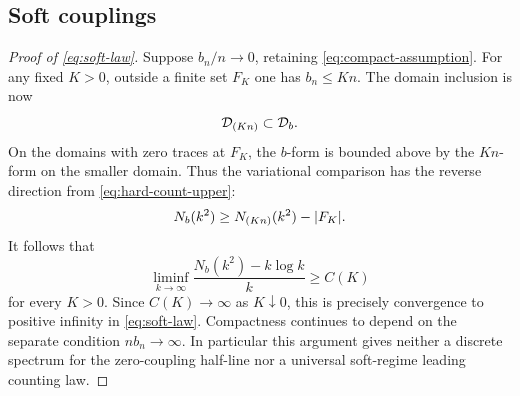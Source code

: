 \subsection{Soft couplings}

\begin{proof}[Proof of \eqref{eq:soft-law}]
Suppose $b_n/n\to0$, retaining
\eqref{eq:compact-assumption}. For any fixed $K>0$,
outside a finite set $F_K$ one has $b_n\le Kn$.
The domain inclusion is now
\begin{equation}
 \mathcal D_{(Kn)}\subset\mathcal D_b.
 \label{eq:soft-domain}
\end{equation}
On the domains with zero traces at $F_K$, the $b$-form
is bounded above by the $Kn$-form on the smaller domain.
Thus the variational comparison has the reverse direction
from \eqref{eq:hard-count-upper}:
\begin{equation}
 N_b(k^2)\ge N_{(Kn)}(k^2)-\lvert F_K\rvert.
 \label{eq:soft-count-lower}
\end{equation}
It follows that
\[
 \liminf_{k\to\infty}\frac{N_b(k^2)-k\log k}{k}
                         \ge C(K)
\]
for every $K>0$. Since $C(K)\to\infty$ as
$K\downarrow0$, this is precisely convergence to positive
infinity in \eqref{eq:soft-law}. Compactness continues to
depend on the separate condition $n b_n\to\infty$.
In particular this argument gives neither a discrete
spectrum for the zero-coupling half-line nor a universal
soft-regime leading counting law.
\end{proof}
